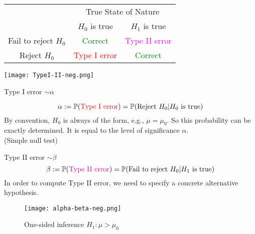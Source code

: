 \begin{frame}[fragile]
\begin{center}
 \renewcommand{\arraystretch}{2.5}
 \begin{tabular}{c|c|c|}
   &  \multicolumn{2}{|c|}{True State of Nature} \\ \cline{2-3}
      &$H_0$ is true & $H_1$ is true\\
  \hline
   Fail to reject $H_0$ & \textcolor{green}{Correct} & \textcolor{magenta}{Type II error}\\
  \cline{2-3}
   Reject $H_0$ & \textcolor{red}{Type I error} & \textcolor{green}{Correct}\\
  \hline
 \end{tabular}
\end{center}
\end{frame}
\begin{frame}
\begin{center}
\texttt{[image: TypeI-II-neg.png]}
\end{center}
\end{frame}
\begin{frame}{Type I error $\sim \alpha$}

 \[
   \alpha:=\mathbb{P}(\text{\textcolor{red}{Type I error}}) = \mathbb{P}(\text{Reject $H_0$}| \text{$H_0$ is true})
 \]
 \vfill\pause
 By convention, $H_0$ is always of the form, e.g.,  $\mu=\mu_0$. So this probability can be exactly determined. It is equal to the level of significance $\alpha$.\\[1em]
 (Simple null test)
\end{frame}
\begin{frame}{Type II error $\sim \beta$}
 \[
   \beta:=\mathbb{P}(\text{\textcolor{magenta}{Type II error}}) = \mathbb{P}(\text{Fail to reject $H_0$}| \text{$H_1$ is true})
 \]
 \vfill\pause
 In order to compute Type II error, we need to specify a concrete alternative hypothesis.
 \vfill
\begin{figure}
 \texttt{[image: alpha-beta-neg.png]}
 \caption{One-sided inference $H_1: \mu>\mu_0$}
\end{figure}

\end{frame}
